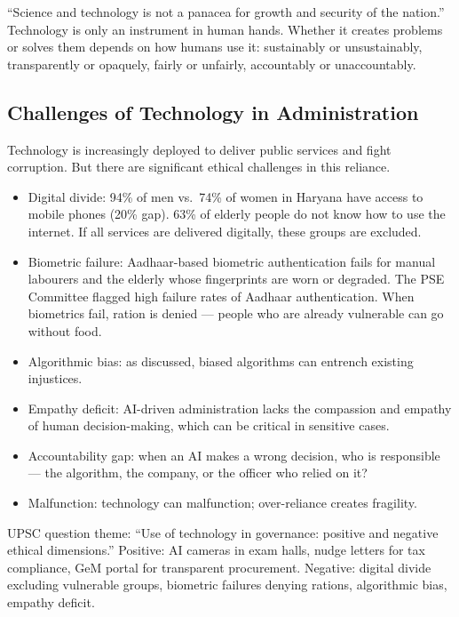 \begin{KeyConcept}
``Science and technology is not a panacea for growth and security of the nation.'' Technology is only an instrument in human hands. Whether it creates problems or solves them depends on how humans use it: sustainably or unsustainably, transparently or opaquely, fairly or unfairly, accountably or unaccountably.
\end{KeyConcept}

\subsection{Challenges of Technology in Administration}

Technology is increasingly deployed to deliver public services and fight corruption. But there are significant ethical challenges in this reliance.

\begin{itemize}
\item Digital divide: 94\% of men vs.\ 74\% of women in Haryana have access to mobile phones (20\% gap). 63\% of elderly people do not know how to use the internet. If all services are delivered digitally, these groups are excluded.
\item Biometric failure: Aadhaar-based biometric authentication fails for manual labourers and the elderly whose fingerprints are worn or degraded. The PSE Committee flagged high failure rates of Aadhaar authentication. When biometrics fail, ration is denied --- people who are already vulnerable can go without food.
\item Algorithmic bias: as discussed, biased algorithms can entrench existing injustices.
\item Empathy deficit: AI-driven administration lacks the compassion and empathy of human decision-making, which can be critical in sensitive cases.
\item Accountability gap: when an AI makes a wrong decision, who is responsible --- the algorithm, the company, or the officer who relied on it?
\item Malfunction: technology can malfunction; over-reliance creates fragility.
\end{itemize}

\begin{PYQLink}
UPSC question theme: ``Use of technology in governance: positive and negative ethical dimensions.'' Positive: AI cameras in exam halls, nudge letters for tax compliance, GeM portal for transparent procurement. Negative: digital divide excluding vulnerable groups, biometric failures denying rations, algorithmic bias, empathy deficit.
\end{PYQLink}

